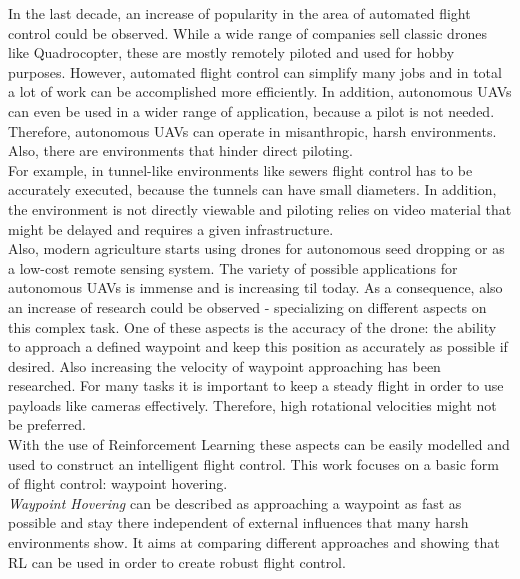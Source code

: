 In the last decade, an increase of popularity in the area of automated flight
control could be observed. While a wide range of companies sell classic
drones like Quadrocopter, these are mostly remotely piloted and used for
hobby purposes.
However, automated flight control can simplify many jobs and in total a
lot of work can be accomplished more efficiently.
In addition, autonomous UAVs can even be used in a wider range of application,
because a pilot is not needed.
Therefore, autonomous UAVs can operate in misanthropic, harsh environments.
Also, there are environments that hinder direct piloting.\\
For example, in tunnel-like environments like sewers flight control has to be accurately
executed, because the tunnels can have small diameters. In addition,
the environment is not directly viewable and piloting relies on video material
that might be delayed and requires a given infrastructure. \\
Also, modern agriculture starts using drones for autonomous seed dropping or
as a low-cost remote sensing system. The variety of possible applications 
for autonomous UAVs is immense and is increasing til today.
As a consequence, also an increase of research could be observed - specializing 
on different aspects on this complex task.
One of these aspects is the accuracy of the drone: the ability to approach 
a defined waypoint and keep this position as accurately as possible if desired.
Also increasing the velocity of waypoint approaching has been researched.
For many tasks it is important to keep a steady flight in order to
use payloads like cameras effectively.
Therefore, high rotational velocities might not be preferred. \\
\newline
With the use of Reinforcement Learning these aspects can be easily modelled
and used to construct an intelligent flight control.
This work focuses on a basic form of flight control: waypoint hovering.\\
\newline
\emph{Waypoint Hovering} can be described as approaching a waypoint as fast as 
possible and stay there independent of external influences that many harsh
environments show. It aims at comparing different approaches and showing
that RL can be used in order to create robust flight control.

\newpage

